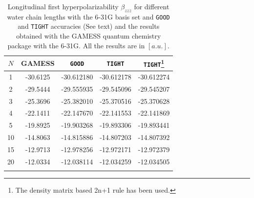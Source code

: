 \documentclass[prl,aps,letterpaper,twocolumn,showpacs,twocolumngrid,superbib]{revtex4}
\begin{document}
\begin{table}
  \centering
  \caption{\protect
    Longitudinal first hyperpolarizability $\beta_{zzz}$
    for different water chain lengths with the 6-31G basis set
    and {\tt GOOD} and {\tt TIGHT} accuracies (See text) and the results obtained with
    the GAMESS quantum chemistry package \cite{gamess} with the 6-31G. 
    All the results are in $[a.u.]$.
  }\label{tab:Beta_1D_Values}
  \begin{tabular}{ccccc}
    \toprule
    $N$ &\multicolumn{1}{c}{{\sc GAMESS}}
    &\multicolumn{1}{c}{{\tt GOOD}}
    &\multicolumn{1}{c}{{\tt TIGHT}}
    &\multicolumn{1}{c}{{\tt TIGHT}\footnote[1]{The density matrix based 2n+1 rule has been used.}} \\
    \hline
     1 & -30.6125 & -30.612180 & -30.612178 & -30.612274  \\
     2 & -29.5444 & -29.555935 & -29.545096 & -29.545207  \\
     3 & -25.3696 & -25.382010 & -25.370516 & -25.370628  \\
     4 & -22.1411 & -22.147670 & -22.141553 & -22.141869  \\
     5 & -19.8925 & -19.903268 & -19.893306 & -19.893441  \\
    10 & -14.8063 & -14.815886 & -14.807203 & -14.807392  \\
    15 & -12.9713 & -12.978256 & -12.972171 & -12.972379  \\
    20 & -12.0334 & -12.038114 & -12.034259 & -12.034505  \\
    \botrule
  \end{tabular}
\end{table}
\end{document}
